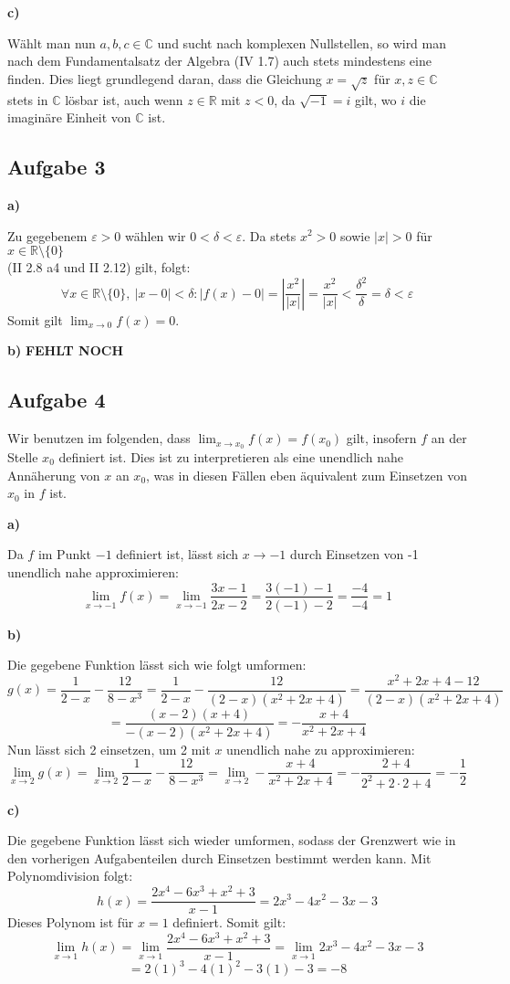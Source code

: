 \documentclass[a4paper,graphics,11pt]{article}
\newcommand{\aufgabe}[1]{\subsection*{Aufgabe #1}}
\begin{document}
\textbf{c)}

Wählt man nun $a,b,c \in \mathbb{C}$ und sucht nach komplexen Nullstellen,
so wird man nach dem Fundamentalsatz der Algebra (IV 1.7) auch stets mindestens eine finden.
Dies liegt grundlegend daran, dass die Gleichung $x = \sqrt{z}$ für $x,z \in \mathbb{C}$
stets in $\mathbb{C}$ lösbar ist, auch wenn $z \in \mathbb{R}$ mit $z < 0$, da $\sqrt{-1} = i$
gilt, wo $i$ die imaginäre Einheit von $\mathbb{C}$ ist.


\aufgabe{3}
\textbf{a)}

Zu gegebenem $\varepsilon > 0$ wählen wir $0 < \delta < \varepsilon$. Da stets
$x^2 > 0$  sowie $|x| > 0$ für $x \in \mathbb{R}\setminus\{0\}$\\
(II 2.8 a4 und II 2.12) gilt, folgt:
$$
    \forall x \in \mathbb{R}\setminus \{0\},\ |x-0| < \delta \colon
    |f(x)-0| = \left|\frac{x^2}{|x|}\right| = \frac{x^2}{|x|} < \frac{\delta^2}{\delta} 
    = \delta < \varepsilon
$$
Somit gilt $\lim_{x \to 0}\limits f(x) = 0$.

\textbf{b)}
\textbf{FEHLT NOCH}

\newpage
\aufgabe{4}
Wir benutzen im folgenden, dass $\lim_{x \to x_0}\limits f(x) = f(x_0)$ gilt, insofern $f$ an
der Stelle $x_0$ definiert ist. Dies ist zu interpretieren als eine unendlich nahe
Annäherung von $x$ an $x_0$, was in diesen Fällen eben äquivalent zum Einsetzen von $x_0$ in
$f$ ist.

\textbf{a)}

Da $f$ im Punkt $-1$ definiert ist, lässt sich $x\to-1$ durch Einsetzen von -1 unendlich
nahe approximieren:
$$
    \lim_{x \to -1} f(x)
    = \lim_{x \to -1} \frac{3x-1}{2x-2}
    = \frac{3(-1)-1}{2(-1)-2} 
    = \frac{-4}{-4}
    = 1
$$

\textbf{b)}

Die gegebene Funktion lässt sich wie folgt umformen:
$$
    g(x) = \frac{1}{2-x} - \frac{12}{8-x^3}
    = \frac{1}{2-x} - \frac{12}{(2-x)(x^2+2x+4)} 
    = \frac{x^2+2x+4-12}{(2-x)(x^2+2x+4)}
$$$$
    = \frac{(x-2)(x+4)}{-(x-2)(x^2+2x+4)}
    = -\frac{x+4}{x^2+2x+4}
$$
Nun lässt sich 2 einsetzen, um 2 mit $x$ unendlich nahe zu approximieren:
$$
    \lim_{x \to 2} g(x)
    = \lim_{x \to 2} \frac{1}{2-x} - \frac{12}{8-x^3}
    = \lim_{x \to 2} -\frac{x+4}{x^2+2x+4}
    = - \frac{2+4}{2^2+2\cdot 2 +4}
    = -\frac{1}{2}
$$

\textbf{c)}

Die gegebene Funktion lässt sich wieder umformen, sodass der Grenzwert wie in den vorherigen
Aufgabenteilen durch Einsetzen bestimmt werden kann. Mit Polynomdivision folgt:
$$
    h(x) = \frac{2x^4-6x^3+x^2+3}{x-1} = 2x^3-4x^2-3x-3
$$
Dieses Polynom ist für $x=1$ definiert. Somit gilt:
$$
    \lim_{x \to 1} h(x)
    = \lim_{x \to 1} \frac{2x^4-6x^3+x^2+3}{x-1}
    = \lim_{x \to 1} 2x^3-4x^2-3x-3
$$$$
    = 2(1)^3-4(1)^2-3(1)-3 = -8
$$
\end{document}
